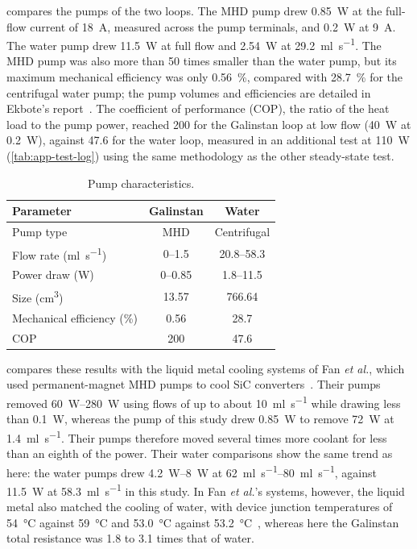  compares the pumps of the two loops. The MHD pump drew
\SI{0.85}{\watt} at the full-flow current of \SI{18}{\ampere}, measured across
the pump terminals, and \SI{0.2}{\watt} at \SI{9}{\ampere}. The water pump drew
\SI{11.5}{\watt} at full flow and \SI{2.54}{\watt} at
\SI{29.2}{\milli\litre\per\second}. The MHD pump was also more than 50 times
smaller than the water pump, but its maximum mechanical efficiency was only
\SI{0.56}{\percent}, compared with \SI{28.7}{\percent} for the centrifugal
water pump; the pump volumes and efficiencies are detailed in Ekbote's
report~\cite{ekbote_project_2026}. The coefficient of performance (COP), the
ratio of the heat load to the pump power, reached 200 for the Galinstan loop at
low flow (\SI{40}{\watt} at \SI{0.2}{\watt}), against 47.6 for the water loop,
measured in an additional test at \SI{110}{\watt} (\cref{tab:app-test-log}) using the same methodology as
the other steady-state test.

\begin{table}[htbp]
  \centering
  \caption{Pump characteristics.}
  \label{tab:pumps}
  \small
  \begin{tabular}{@{}lcc@{}}
    \toprule
    Parameter & Galinstan & Water \\
    \midrule
    Pump type & MHD & Centrifugal \\
    Flow rate (\si{\milli\litre\per\second}) & 0--1.5 & 20.8--58.3 \\
    Power draw (\si{\watt}) & 0--0.85 & 1.8--11.5 \\
    Size (\si{\centi\metre\cubed}) & 13.57 & 766.64 \\
    Mechanical efficiency\tnote{a} (\si{\percent}) & 0.56 & 28.7 \\
    COP\tnote{b} & 200 & 47.6 \\
    \bottomrule
  \end{tabular}
\end{table}

 compares these results with the liquid metal cooling
systems of Fan \emph{et al.}, which used permanent-magnet MHD pumps to cool SiC
converters~\cite{fan_liquid_2021,fan_high_2023,fan_ultra-efficient_2026}. Their
pumps removed \SIrange{60}{280}{\watt} using flows of up to about
\SI{10}{\milli\litre\per\second} while drawing less than \SI{0.1}{\watt},
whereas the pump of this study drew \SI{0.85}{\watt} to remove \SI{72}{\watt}
at \SI{1.4}{\milli\litre\per\second}. Their pumps therefore moved several times
more coolant for less than an eighth of the power. Their water comparisons show
the same trend as here: the water pumps drew \SIrange{4.2}{8}{\watt} at
\SIrange{62}{80}{\milli\litre\per\second}, against \SI{11.5}{\watt} at
\SI{58.3}{\milli\litre\per\second} in this study. In Fan \emph{et al.}'s
systems, however, the liquid metal also matched the cooling of water, with
device junction temperatures of \SI{54}{\celsius} against \SI{59}{\celsius} and
\SI{53.0}{\celsius} against \SI{53.2}{\celsius}~\cite{fan_liquid_2021}, whereas
here the Galinstan total resistance was 1.8 to 3.1 times that of water.

